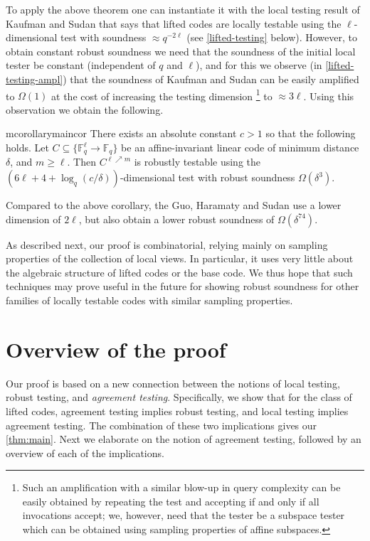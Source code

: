 \documentclass{toc}
\theoremstyle{plain}
\newcommand{\F}{{\mathbb{F}}}
\newcommand{\Func}[1]{\{\F_q^{#1} \to \F_q\}}
\begin{document}
To apply the above theorem one can instantiate it with the local testing result of Kaufman and Sudan \cite{KaufmanS2008}  that says that lifted codes are locally testable using the $\ell$-dimensional test with soundness $\approx q^{-2\ell}$ (see \cref{lifted-testing} below).
However, to obtain constant robust soundness we need that the soundness 
of the initial local tester
%
be constant (independent of $q$ and $\ell$), and for this we observe (in \cref{lifted-testing-ampl}) that the soundness of Kaufman and Sudan \cite{KaufmanS2008} can be easily amplified to $\Omega(1)$ at the cost of increasing the testing dimension%
%
%
\footnote{Such an amplification with
a  %
similar blow-up in query complexity can be easily obtained by repeating the test and accepting if and only if all invocations accept; we,
 however,  %
 need that the tester %
 be a subspace tester which can be obtained using sampling properties of affine subspaces.}   
to $\approx 3\ell$. %
Using this observation we obtain the following.

\begin{restatable}{mcorollary}{maincor}\label{cor:main}
%
There exists an absolute constant $c>1$ so that the following holds.
Let $C \subseteq \Func{\ell}$ be an affine-invariant linear  code of
%
minimum   %
distance $\delta$, and $m \geq \ell$. Then $C^{\ell \nearrow
  m}$ is robustly testable using the
$(6\ell+4+\log_q(c/\delta))$-dimensional test  with robust soundness
$\Omega( \delta^3)$.
%
\end{restatable}


Compared to the above corollary, the %
Guo, Haramaty and Sudan \cite{GuoHS2015} %
use  %
a lower dimension of $2\ell$, but also obtain a 
lower robust soundness of $\Omega(\delta^{74})$.

As described next, our proof is combinatorial, relying mainly on sampling properties of the collection of local views. In particular, it uses very little about the algebraic structure of lifted codes or the base code.
We thus hope that such techniques %
may  %
prove useful in the future for showing robust soundness for 
other families of locally testable codes with similar sampling properties.

%
\section{Overview of the proof}  %
\label{sec:proof-overview}

Our proof is based on a new connection between the notions of local testing, robust testing, and \emph{agreement testing}. Specifically, we show that for the class of lifted codes, %
 agreement testing implies robust testing, and local testing implies agreement testing. The combination of these two implications gives our \cref{thm:main}. Next we elaborate on the notion of agreement testing, followed by an overview of each of the implications.
\end{document}
